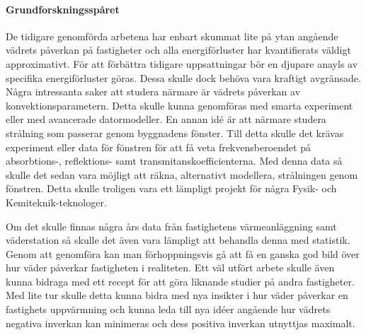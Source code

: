\paragraph{Grundforskningsspåret}

De tidigare genomförda arbetena har enbart skummat lite på ytan angående vädrets påverkan på fastigheter och alla energiförluster
har kvantifierats väldigt approximativt. För att förbättra tidigare uppsattningar bör en djupare anayls av specifika energiförluster göras. Dessa skulle dock behöva vara kraftigt avgränsade. Några intressanta saker att studera
närmare är vädrets påverkan av konvektionsparametern. Detta skulle kunna genomföras med smarta experiment eller
med avancerade datormodeller. En annan idé är att närmare studera strålning som passerar genom byggnadens fönster. Till detta
skulle det krävas experiment eller data för fönstren för att få veta frekvensberoendet på absorbtions-, reflektions- samt
transmitanskoefficienterna. Med
denna data så skulle det sedan vara möjligt att räkna, alternativt modellera, strålningen genom fönstren. Detta skulle troligen
vara ett lämpligt projekt för några Fysik- och Kemiteknik-teknologer.

Om det skulle finnas några års data från fastighetens värmeanläggning samt väderstation så skulle det
även vara lämpligt att behandla denna med statistik. Genom att genomföra kan man förhoppningsvis
gå att få en ganska god bild över hur väder påverkar fastigheten i realiteten. Ett väl utfört arbete skulle
även kunna bidraga med ett recept för att göra liknande studier på andra fastigheter. Med lite tur skulle detta
kunna bidra med nya insikter i hur väder påverkar en fastighets uppvärmning och kunna leda till nya idéer angående
hur vädrets negativa inverkan kan minimeras och dess positiva inverkan utnyttjas maximalt.
